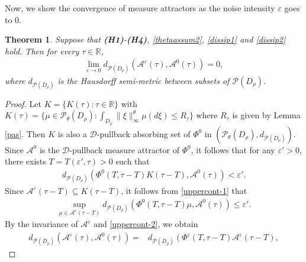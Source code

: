 \documentclass[11pt]{article}
\numberwithin{equation}{section}
\theoremstyle{plain}
\newtheorem{theorem}{Theorem}[section]
\begin{document}
 Now, we show the convergence of measure attractors as the noise intensity $\varepsilon$ goes to $0$.

\begin{theorem}\label{uppercont}
   Suppose that {\bf(H1)}-{\bf(H4)}, \eqref{thetaassum2}, \eqref{dissip1} and \eqref{dissip2} hold.
   Then for every $\tau \in \mathbb{R}$,
   \begin{align*}
      \lim_{\varepsilon \to 0}
         d_{\mathcal{P}(D_\rho)}
           \left( \mathcal{A}^\varepsilon(\tau), \mathcal{A}^0(\tau) \right) = 0,
   \end{align*}
   where $d_{\mathcal{P}(D_\rho)}$ is the Hausdorff semi-metric between subsets of $\mathcal{P}(D_\rho)$.
\end{theorem}

\begin{proof}
 Let $ {K} = \{K(\tau): \tau \in \mathbb{R} \}$
 with
           $ K(\tau)      = \{\mu \in \mathcal{P}_{\theta}(D_\rho):
                               \int_{D_\rho} \| \xi \|_{\infty}^{\theta} \mu(d \xi)
                               \le R_{\tau}
                    \}$ 
 where $R_\tau$ is given by Lemma \ref{pas}.
 Then $ {K}$ is also a $\mathcal{D}$-pullback absorbing set of $\Phi^0$ in $
 (\mathcal{P}_{\theta}(D_\rho), d_{\mathcal{P}(D_\rho)})$.
 Since $\mathcal{A}^0$ is the $\mathcal{D}$-pullback measure attractor of $\Phi^0$,
 it follows that for any $\varepsilon' > 0$, there exists $T = T(\varepsilon',\tau) > 0$ such that
 \begin{align}\label{uppercont-1}
    d_{ \mathcal{P}(D_\rho) }
          \left( \Phi^0(T,\tau-T) K(\tau-T),
                 \mathcal{A}^0(\tau)
          \right)
    < \varepsilon'.
 \end{align}
 Since $ \mathcal{A}^\varepsilon(\tau - T) \subseteq K(\tau-T)$,
 it follows from \eqref{uppercont-1} that 
 \begin{align}\label{uppercont-2}
    \sup_{\mu \in \mathcal{A}^\varepsilon(\tau-T)}
          d_{\mathcal{P}(D_\rho) }
                 (\Phi^0(T, \tau - T) \mu, \mathcal{A}^0(\tau))
    \le \varepsilon'.
 \end{align}
 By the invariance of $\mathcal{A}^\varepsilon$ and \eqref{uppercont-2},
 we obtain
 \begin{align} \label{uppercont-3}
        d_{\mathcal{P}(D_\rho) }
              \left( \mathcal{A}^\varepsilon(\tau),
                     \mathcal{A}^0(\tau)
              \right)
    = & d_{ \mathcal{P}(D_\rho) }
              \left( \Phi^\varepsilon(T,\tau-T) \mathcal{A}^\varepsilon(\tau-T),

\end{align}
\end{proof}
\end{document}
